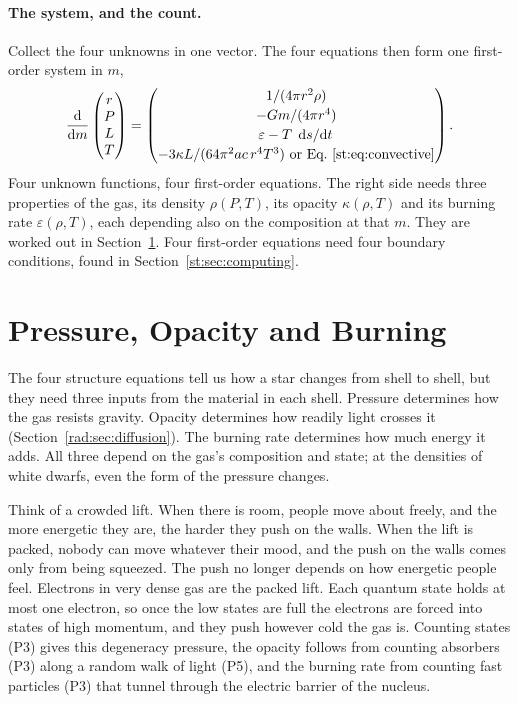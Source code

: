\paragraph{The system, and the count.} Collect the four unknowns in one vector. The four equations then form one first-order system in $m$,
\begin{equation}
	\dv{m}\begin{pmatrix}r\\P\\L\\T\end{pmatrix}
	=\begin{pmatrix}
		1/(4\pi r^2\rho)\\[2pt]
		-Gm/(4\pi r^4)\\[2pt]
		\varepsilon-T\,\dv*{s}{t}\\[2pt]
		-3\kappa L/(64\pi^2ac\,r^4T^3)\ \text{or Eq.~\eqref{st:eq:convective}}
	\end{pmatrix}.
	\label{st:eq:system}
\end{equation}
Four unknown functions, four first-order equations. The right side needs three properties of the gas, its density $\rho(P,T)$, its opacity $\kappa(\rho,T)$ and its burning rate $\varepsilon(\rho,T)$, each depending also on the composition at that $m$. They are worked out in Section~\ref{st:sec:eos}. Four first-order equations need four boundary conditions, found in Section~\ref{st:sec:computing}.

\section{Pressure, Opacity and Burning}
\label{st:sec:eos}

The four structure equations tell us how a star changes from shell to shell, but they need three inputs from the material in each shell. Pressure determines how the gas resists gravity. Opacity determines how readily light crosses it (Section~\ref{rad:sec:diffusion}). The burning rate determines how much energy it adds. All three depend on the gas's composition and state; at the densities of white dwarfs, even the form of the pressure changes.

Think of a crowded lift. When there is room, people move about freely, and the more energetic they are, the harder they push on the walls. When the lift is packed, nobody can move whatever their mood, and the push on the walls comes only from being squeezed. The push no longer depends on how energetic people feel. Electrons in very dense gas are the packed lift. Each quantum state holds at most one electron, so once the low states are full the electrons are forced into states of high momentum, and they push however cold the gas is. Counting states (P3) gives this degeneracy pressure, the opacity follows from counting absorbers (P3) along a random walk of light (P5), and the burning rate from counting fast particles (P3) that tunnel through the electric barrier of the nucleus.


